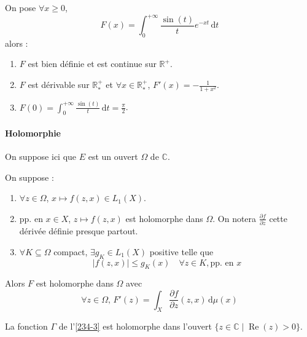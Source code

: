 
  \begin{application}
    On pose $\forall x \geq 0$,
    \[ F(x) = \int_0^{+\infty} \frac{\sin(t)}{t} e^{-xt} \, \mathrm{d}t \]
    alors :
    \begin{enumerate}[label={\bfseries(\roman*)}]
      \item $F$ est bien définie et est continue sur $\mathbb{R}^+$.
      \item $F$ est dérivable sur $\mathbb{R}^+_*$ et $\forall x \in \mathbb{R}^+_*$, $F'(x) = -\frac{1}{1+x^2}$.
      \item $F(0) = \int_0^{+\infty} \frac{\sin(t)}{t} \, \mathrm{d}t = \frac{\pi}{2}$.
    \end{enumerate}
  \end{application}

  \paragraph{Holomorphie}


  On suppose ici que $E$ est un ouvert $\Omega$ de $\mathbb{C}$.

  \begin{theorem}
    On suppose :
    \begin{enumerate}[label={\bfseries(\roman*)}]
      \item $\forall z \in \Omega$, $x \mapsto f(z,x) \in L_1(X)$.
      \item pp. en $x \in X$, $z \mapsto f(z,x)$ est holomorphe dans $\Omega$. On notera $\frac{\partial f}{\partial z}$ cette dérivée définie presque partout.
      \item $\forall K \subseteq \Omega$ compact, $\exists g_K \in L_1(X)$ positive telle que
      \[ \left| f(z,x) \right| \leq g_K(x) \quad \forall z \in K, \text{pp. en } x \]
    \end{enumerate}
    Alors $F$ est holomorphe dans $\Omega$ avec
    \[ \forall z \in \Omega, \, F'(z) = \int_X \frac{\partial f}{\partial z}(z, x) \, \mathrm{d}\mu(x) \]
  \end{theorem}


  \begin{example}
    La fonction $\Gamma$ de l'\cref{234-3} est holomorphe dans l'ouvert $\{ z \in \mathbb{C} \mid \operatorname{Re}(z) > 0 \}$.
  \end{example}

